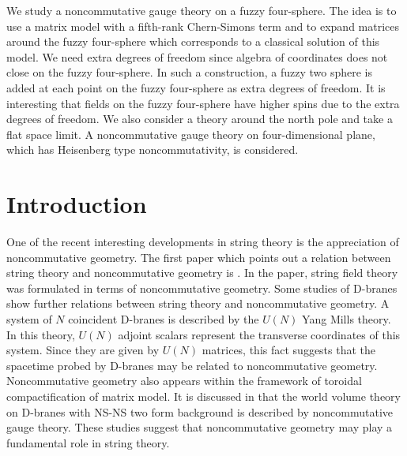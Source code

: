 \documentclass[a4paper,11pt]{article}
\begin{document}
\begin{abstract}
\noindent
\end{abstract}
\noindent 
\hspace{0.4cm}
We study a noncommutative gauge theory on a fuzzy four-sphere. 
The idea is to use a matrix model with a fifth-rank Chern-Simons term 
and to expand matrices around the fuzzy four-sphere 
which corresponds to a classical solution of this model. 
We need extra degrees of freedom since algebra of coordinates 
does not close on the fuzzy four-sphere. 
In such a construction, 
a fuzzy two sphere is added 
at each point on the fuzzy four-sphere 
as extra degrees of freedom. 
It is interesting that fields on the fuzzy four-sphere have 
higher spins due to the extra degrees of freedom. 
We also consider a theory around the north pole and 
take a flat space limit. 
A noncommutative gauge theory on four-dimensional plane, 
which has Heisenberg type noncommutativity, is considered. 





\newpage 

\section{Introduction}

\hspace{0.4cm}
One of the recent interesting developments in string theory is the 
appreciation of noncommutative geometry. 
The first paper which points out a relation 
between string theory and noncommutative geometry 
is \cite{wittenopensft}. 
In the paper, string field theory was formulated in terms 
of noncommutative geometry. 
Some studies of D-branes 
show further relations between string theory and 
noncommutative geometry.  
A system of $N$ coincident D-branes 
is described by the $U(N)$ Yang Mills theory. 
In this theory, $U(N)$ adjoint scalars represent 
the transverse coordinates of this system. 
Since they are given by $U(N)$ matrices, this fact suggests that 
the spacetime probed by D-branes may be 
related to noncommutative geometry. 
Noncommutative geometry also appears 
within the framework of toroidal compactification 
of matrix model\cite{CDS}. 
It is discussed in \cite{SW} that 
the world volume theory on D-branes with NS-NS two form  
background is described by noncommutative gauge theory. 
These studies suggest that noncommutative geometry 
may play a fundamental role in string theory. 
\end{document}
